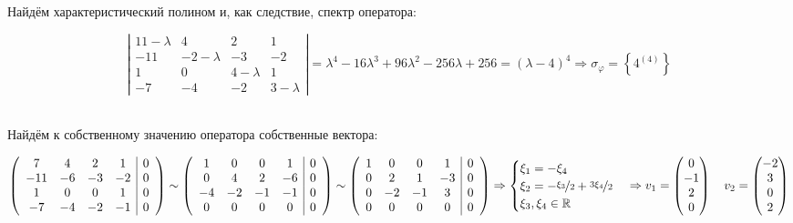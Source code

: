\documentclass{article}
\newcommand{\la}{\lambda}
\begin{document}
\begin{center}
Найдём характеристический полином и, как следствие, спектр оператора:
\end{center}
$$\left|\begin{matrix}
11-\la & 4 & 2 & 1 \\
-11 & -2-\la & -3 & -2 \\
1 & 0 & 4-\la & 1 \\
-7 & -4 & -2 & 3-\la
\end{matrix}\right| = \la^4-16\la^3+96\la^2-256\la+256 = (\la - 4)^4 \Rightarrow \sigma_\varphi = \left\{4^{(4)}\right\}$$ \\

\begin{center}
Найдём к собственному значению оператора собственные вектора:
\end{center}
$$\left(\begin{array}{cccc|c}
7 & 4 & 2 & 1 & 0\\
-11 & -6 & -3 & -2 & 0 \\
1 & 0 & 0 & 1 & 0\\
-7 & -4 & -2 & -1 & 0
\end{array}\right) \sim \left(\begin{array}{cccc|c}
1 & 0 & 0 & 1 & 0\\
0 & 4 & 2 & -6 & 0\\
-4 & -2 & -1 & -1 & 0 \\
0 & 0 & 0 & 0 & 0
\end{array}\right) \sim \left(\begin{array}{cccc|c}
1 & 0 & 0 & 1 & 0\\
0 & 2 & 1 & -3 & 0\\
0 & -2 & -1 & 3 & 0 \\
0 & 0 & 0 & 0 & 0
\end{array}\right) \Rightarrow \begin{cases}
\xi_1 = -\xi_4 \\
\xi_2 = -\nicefrac{\xi_3}{2} +\nicefrac{3\xi_4}{2} \\
\xi_3, \xi_4 \in \mathbb{R}
\end{cases} \Rightarrow v_1 = \begin{pmatrix}
0 \\ -1 \\ 2 \\ 0
\end{pmatrix}\quad v_2 = \begin{pmatrix}
-2 \\ 3 \\ 0 \\ 2
\end{pmatrix}$$ \\ 
\end{document}
